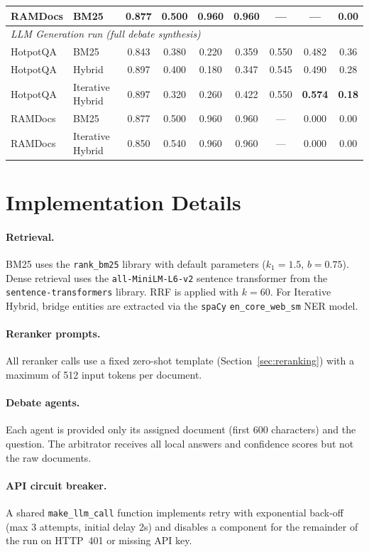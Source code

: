 \documentclass{article}
\begin{document}
\begin{table}[h]
\begin{tabular}{llccccccc}
    RAMDocs  & BM25             & 0.877 & 0.500 & 0.960 & 0.960 & —     & — & 0.00 \\
    \midrule
    \multicolumn{9}{l}{\textit{LLM Generation run (full debate synthesis)}} \\
    HotpotQA & BM25             & 0.843 & 0.380 & 0.220 & 0.359 & 0.550 & 0.482 & 0.36 \\
    HotpotQA & Hybrid           & 0.897 & 0.400 & 0.180 & 0.347 & 0.545 & 0.490 & 0.28 \\
    HotpotQA & Iterative Hybrid & 0.897 & 0.320 & 0.260 & 0.422 & 0.550 & \textbf{0.574} & \textbf{0.18} \\
    RAMDocs  & BM25             & 0.877 & 0.500 & 0.960 & 0.960 & —     & 0.000 & 0.00 \\
    RAMDocs  & Iterative Hybrid & 0.850 & 0.540 & 0.960 & 0.960 & —     & 0.000 & 0.00 \\
    \bottomrule
  \end{tabular}
\end{table}

\section{Implementation Details}
\label{app:impl}

\paragraph{Retrieval.} BM25 uses the \texttt{rank\_bm25} library with
default parameters ($k_1=1.5$, $b=0.75$).  Dense retrieval uses the
\texttt{all-MiniLM-L6-v2} sentence transformer from the
\texttt{sentence-transformers} library.  RRF is applied with $k=60$.
For Iterative Hybrid, bridge entities are extracted via the
\texttt{spaCy} \texttt{en\_core\_web\_sm} NER model.

\paragraph{Reranker prompts.} All reranker calls use a fixed zero-shot
template (Section~\ref{sec:reranking}) with a maximum of 512 input
tokens per document.

\paragraph{Debate agents.} Each agent is provided only its assigned
document (first 600 characters) and the question.  The arbitrator
receives all local answers and confidence scores but not the raw
documents.

\paragraph{API circuit breaker.} A shared \texttt{make\_llm\_call}
function implements retry with exponential back-off (max 3 attempts,
initial delay 2s) and disables a component for the remainder of the run
on HTTP~401 or missing API key.
\end{document}
